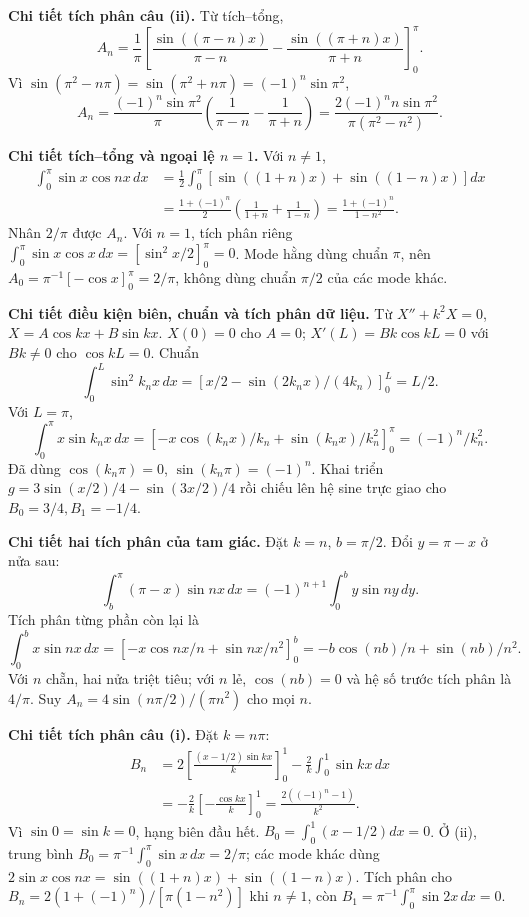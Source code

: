 \textbf{Chi tiết tích phân câu (ii).} Từ tích–tổng,
\[A_n=\frac1\pi\left[\frac{\sin((\pi-n)x)}{\pi-n}-\frac{\sin((\pi+n)x)}{\pi+n}\right]_0^\pi.\]
Vì $\sin(\pi^2-n\pi)=\sin(\pi^2+n\pi)=(-1)^n\sin\pi^2$,
\[A_n=\frac{(-1)^n\sin\pi^2}{\pi}\left(\frac1{\pi-n}-\frac1{\pi+n}\right)
=\frac{2(-1)^nn\sin\pi^2}{\pi(\pi^2-n^2)}.\]

\textbf{Chi tiết tích–tổng và ngoại lệ $n=1$.} Với $n\ne1$,
\[\begin{aligned}
\int_0^\pi\sin x\cos nx\,dx
&=\frac12\int_0^\pi[\sin((1+n)x)+\sin((1-n)x)]dx\\
&=\frac{1+(-1)^n}{2}\left(\frac1{1+n}+\frac1{1-n}\right)
=\frac{1+(-1)^n}{1-n^2}.
\end{aligned}\]
Nhân $2/\pi$ được $A_n$. Với $n=1$, tích phân riêng $\int_0^\pi\sin x\cos x\,dx=[\sin^2x/2]_0^\pi=0$. Mode hằng dùng chuẩn $\pi$, nên $A_0=\pi^{-1}[-\cos x]_0^\pi=2/\pi$, không dùng chuẩn $\pi/2$ của các mode khác.

\textbf{Chi tiết điều kiện biên, chuẩn và tích phân dữ liệu.} Từ $X''+k^2X=0$, $X=A\cos kx+B\sin kx$. $X(0)=0$ cho $A=0$; $X'(L)=Bk\cos kL=0$ với $Bk\ne0$ cho $\cos kL=0$. Chuẩn
\[\int_0^L\sin^2k_nx\,dx=\left[x/2-\sin(2k_nx)/(4k_n)\right]_0^L=L/2.\]
Với $L=\pi$,
\[\int_0^\pi x\sin k_nx\,dx=
\left[-x\cos(k_nx)/k_n+\sin(k_nx)/k_n^2\right]_0^\pi
=(-1)^n/k_n^2.\]
Đã dùng $\cos(k_n\pi)=0$, $\sin(k_n\pi)=(-1)^n$. Khai triển $g=3\sin(x/2)/4-\sin(3x/2)/4$ rồi chiếu lên hệ sine trực giao cho $B_0=3/4,B_1=-1/4$.

\textbf{Chi tiết hai tích phân của tam giác.} Đặt $k=n$, $b=\pi/2$. Đổi $y=\pi-x$ ở nửa sau:
\[\int_b^\pi(\pi-x)\sin nx\,dx=(-1)^{n+1}\int_0^b y\sin ny\,dy.\]
Tích phân từng phần còn lại là
\[\int_0^b x\sin nx\,dx=\left[-x\cos nx/n+\sin nx/n^2\right]_0^b
=-b\cos(nb)/n+\sin(nb)/n^2.\]
Với $n$ chẵn, hai nửa triệt tiêu; với $n$ lẻ, $\cos(nb)=0$ và hệ số trước tích phân là $4/\pi$. Suy $A_n=4\sin(n\pi/2)/(\pi n^2)$ cho mọi $n$.

\textbf{Chi tiết tích phân câu (i).} Đặt $k=n\pi$:
\[\begin{aligned}
B_n&=2\left[\frac{(x-1/2)\sin kx}{k}\right]_0^1-\frac2k\int_0^1\sin kx\,dx\\
&=-\frac2k\left[-\frac{\cos kx}{k}\right]_0^1
=\frac{2((-1)^n-1)}{k^2}.
\end{aligned}\]
Vì $\sin0=\sin k=0$, hạng biên đầu hết. $B_0=\int_0^1(x-1/2)dx=0$. Ở (ii), trung bình $B_0=\pi^{-1}\int_0^\pi\sin x\,dx=2/\pi$; các mode khác dùng $2\sin x\cos nx=\sin((1+n)x)+\sin((1-n)x)$. Tích phân cho $B_n=2(1+(-1)^n)/[\pi(1-n^2)]$ khi $n\ne1$, còn $B_1=\pi^{-1}\int_0^\pi\sin2x\,dx=0$.

